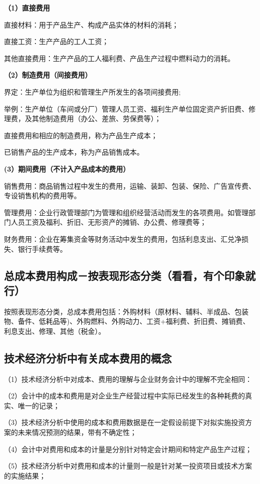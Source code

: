\textbf{（1）直接费用}

直接材料：用于产品生产、构成产品实体的材料的消耗；

直接工资：生产产品的工人工资；

其他直接费用：生产产品的工人福利费、产品生产过程中燃料动力的消耗。

\textbf{（2）制造费用（间接费用）}

界定：生产单位为组织和管理生产所发生的各项间接费用;

举例：生产单位（车间或分厂）管理人员工资、福利生产单位固定资产折旧费、修理费，及其他制造费用（办公、差旅、劳保费等）；

直接费用和相应的制造费用，称为产品生产成本；

已销售产品的生产成本，称为产品销售成本。

\textbf{(3）期间费用（不计入产品成本的费用）}

销售费用：商品销售过程中发生的费用，运输、装卸、包装、保险、广告宣传费、专设销售机构的费用等。

管理费用：企业行政管理部门为管理和组织经营活动而发生的各项费用。如管理部门人员工资及福利、折旧、无形资产的摊销、办公费、修理费等；

财务费用：企业在筹集资金等财务活动中发生的费用，包括利息支出、汇兑净损失、银行手续费等。

\subsection{总成本费用构成－按表现形态分类（看看，有个印象就行）}
按照表现形态分类，总成本费用包括：外购材料（原材料、辅料、半成品、包装物、备件、低耗品等)、外购燃料、外购动力、工资+福利费、折旧费、摊销费、利息支出、修理、其他（税金）。

\subsection{技术经济分析中有关成本费用的概念}
（1）技术经济分析中对成本、费用的理解与企业财务会计中的理解不完全相同：

（2）会计中的成本和费用是对企业生产经营过程中实际已经发生的各种耗费的真实、唯一的记录；

（3）技术经济分析中使用的成本和费用数据是在一定假设前提下对拟实施投资方案的未来情况预测的结果，带有不确定性；

（4）会计中对费用和成本的计量是分别针对特定会计期间和特定产品生产过程；

（5）技术经济分析中对费用和成本的计量则一般是针对某一投资项目或技术方案的实施结果；


